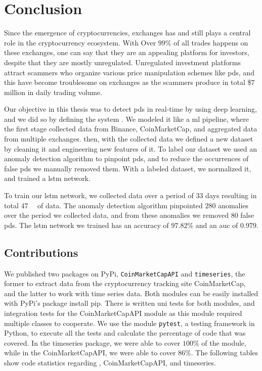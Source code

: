 
\chapter{Conclusion}\label{ch:conclusion}\glsresetall
Since the emergence of cryptocurrencies, exchanges has and still plays a central role in the cryptocurrency ecosystem. With Over $99\%$ of all trades happens on these exchanges, one can say that they are an appealing platform for investors, despite that they are mostly unregulated. Unregulated investment platforms attract scammers who organize various price manipulation schemes like \acp{pd}, and this have become troublesome on exchanges as the scammers produce in total \$$7$ million in daily trading volume.

Our objective in this thesis was to detect \acp{pd} in real-time by using deep learning, and we did so by defining the system \project. We modeled it like a \ac{ml} pipeline, where the first stage collected data from Binance, CoinMarketCap, and aggregated data from multiple exchanges. then, with the collected data we defined a new dataset by cleaning it and engineering new features of it. To label our dataset we used an anomaly detection algorithm to pinpoint \acp{pd}, and to reduce the occurrences of false \acp{pd} we manually removed them. With a labeled dataset, we normalized it, and trained a \ac{lstm} network.

To train our \ac{lstm} network, we collected data over a period of $33$ days resulting in total \SI{47}{\giga\byte} of data. The anomaly detection algorithm pinpointed $280$ anomalies over the period we collected data, and from these anomalies we removed $80$ false \acp{pd}. The \ac{lstm} network we trained has an accuracy of $97.82\%$ and an \ac{auc} of $0.979$.

\section{Contributions}
We published two packages on PyPi,  \texttt{CoinMarketCapAPI} and \texttt{timeseries}, the former to extract data from the cryptocurrency tracking site CoinMarketCap, and the latter to work with time series data. Both modules can be easily installed with PyPi's package install pip. There is written uni tests for both modules, and integration tests for the CoinMarketCapAPI module as this module required multiple classes to cooperate. We use the module \texttt{pytest}, a testing framework in Python, to execute all the tests and calculate the percentage of code that was covered. In the timeseries package, we were able to cover $100\%$ of the module, while in the CoinMarketCapAPI, we were able to cover $86\%$. The following tables show code statistics regarding \project, CoinMarketCapAPI, and timeseries.

